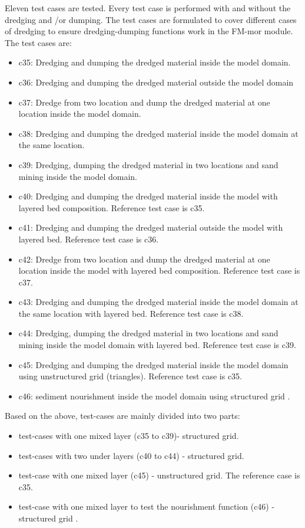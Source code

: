 Eleven test cases are tested. Every test case is performed with and without the dredging and /or dumping. The test cases are formulated to cover different cases of dredging to ensure  dredging-dumping functions work in the FM-mor module. The test cases are:
\begin{itemize}
	\item[$\bullet$] c35: Dredging and dumping the dredged material inside the model domain.
	\item[$\bullet$] c36: Dredging and dumping the dredged material outside the model domain
	\item[$\bullet$] c37: Dredge from two location and dump the dredged material at one location  inside  the model domain.
	\item[$\bullet$] c38: Dredging  and dumping the dredged material inside  the model domain at the same location. 
	\item[$\bullet$] c39: Dredging, dumping the dredged material in two locations and sand mining inside  the model domain. 
	\item[$\bullet$] c40: Dredging and dumping the dredged material inside the model  with layered bed composition. Reference test case is c35.
	\item[$\bullet$] c41: Dredging and dumping the dredged material outside the model with layered bed. Reference test case is c36.
	\item[$\bullet$] c42: Dredge from two location and dump the dredged material at one location  inside  the model with layered bed composition. Reference test case is c37.
	\item[$\bullet$] c43: Dredging  and dumping the dredged material inside  the model domain at the same location with layered bed. Reference test case is c38.
	\item[$\bullet$] c44: Dredging, dumping the dredged material in two locations and sand mining inside  the model domain with layered bed. Reference test case is c39.
	\item[$\bullet$] c45: Dredging and dumping the dredged material inside the model domain using unstructured grid (triangles). Reference test case is c35.
	\item[$\bullet$] c46: sediment nourishment inside the model domain using structured grid .
\end{itemize}
Based on the above,  test-cases are mainly divided into two parts:
\begin{itemize}
	\item[$\bullet$] test-cases with one mixed layer (c35 to c39)- structured grid.
	\item[$\bullet$] test-cases with two under layers (c40 to c44) - structured grid.
	\item[$\bullet$] test-case with one mixed layer (c45) - unstructured grid. The reference case is c35.
	\item[$\bullet$] test-case with one mixed layer to test the nourishment function (c46) - structured grid . 
\end{itemize}

